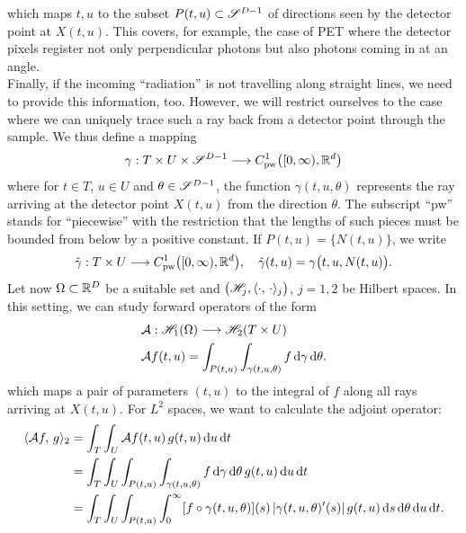 \documentclass{amsart}
\begin{document}
%
which maps $t, u$ to the subset $P(t, u) \subset \mathscr{S}^{D-1}$ of directions seen by the detector point at $X(t, u)$. This covers, for 
example, the case of PET where the detector pixels register not only perpendicular photons but also photons coming in at an angle.\\[1ex]
%
%
Finally, if the incoming ``radiation'' is not travelling along straight lines, we need to provide this information, too. However, we will 
restrict ourselves to the case where we can uniquely trace such a ray back from a detector point through the sample. We thus define a 
mapping
%
\begin{equation}
 \label{eq:general:rays}
 \gamma: T \times U \times \mathscr{S}^{D-1} \longrightarrow C_{\mathrm{pw}}^1\big([0,\infty), {\mathbb{R}}^d\big)
\end{equation} 
%
where for $t \in T$, $u \in U$ and $\theta \in \mathscr{S}^{D-1}$, the function $\gamma(t, u, \theta)$ represents the ray arriving at the 
detector point $X(t, u)$ from the direction $\theta$. The subscript ``pw'' stands for ``piecewise'' with the restriction that the lengths 
of such pieces must be bounded from below by a positive constant.  If $P(t,u) = \lbrace N(t,u)\rbrace$, we write 
%
\begin{equation}
 \label{eq:general:ray_onedir}
 \tilde \gamma: T \times U \longrightarrow C_{\mathrm{pw}}^1\big([0,\infty), {\mathbb{R}}^d\big),\quad \tilde \gamma(t,u) = \gamma\big(t, u, N(t,u)\big).
\end{equation}
%
%
Let now $\Omega \subset {\ensuremath{\mathbb{R}}}^D$ be a suitable set and $\big({\mathscr{H}}_j, \langle \cdot,\,\cdot\rangle_j\big)$, $j=1,2$ be Hilbert spaces. In this 
setting, we can study forward operators of the form
%
\begin{align}
 & {\mathcal{A}}: {\mathscr{H}}_1(\Omega) \longrightarrow {\ensuremath{\mathscr{H}}}_2(T \times U) \notag \\
 \label{eq:general:fwdproj}
 & {\mathcal{A}} f(t, u) = \int_{P(t, u)} \int_{\gamma(t, u, \theta)} f \, \mathrm{d} \gamma\, \mathrm{d} \theta.
\end{align}
%
which maps a pair of parameters $(t, u)$ to the integral of $f$ along all rays arriving at $X(t, u)$. For $L^2$ spaces, we want to 
calculate the adjoint operator:
%
\begin{align}
 \langle {\ensuremath{\mathcal{A}}} f,\,g\rangle_2 
 &= \int_T \int_U {\mathcal{A}} f(t, u)\, g(t, u)\, \mathrm{d} u\, \mathrm{d} t \notag \\
 &= \int_T \int_U \int_{P(t, u)} \int_{\gamma(t, u, \theta)} f \, \mathrm{d} \gamma\, \mathrm{d} \theta\, g(t, u)\, \mathrm{d} u\, \mathrm{d} t \notag \\
 \label{eq:general:backproj_calculation_step1}
 &= \int_T \int_U \int_{P(t, u)} \int_0^\infty  [f \circ \gamma(t, u, \theta)](s)\, |\gamma(t, u, \theta)'(s)|\, g(t, u)\, \mathrm{d} s\, 
 \mathrm{d} \theta\, \mathrm{d} u\, \mathrm{d} t.
\end{align}
\end{document}
